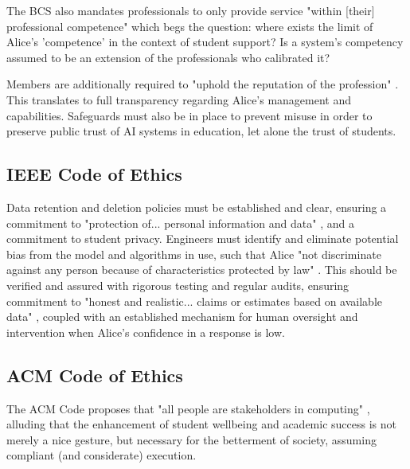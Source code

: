 \documentclass[14pt,a4paper]{article}
\begin{document}
\begin{multicols}{2}
The BCS also mandates professionals to only provide service "within [their] professional competence" \textit{\parencite[p. 2]{BCS2024}} which begs the question: where exists the limit of Alice's 'competence' in the context of student support? Is a system's competency assumed to be an extension of the professionals who calibrated it?

Members are additionally required to "uphold the reputation of the profession" \textit{\parencite[p. 3]{BCS2024}}. This translates to full transparency regarding Alice's management and capabilities. Safeguards must also be in place to prevent misuse in order to preserve public trust of AI systems in education, let alone the trust of students.

\subsection{IEEE Code of Ethics}


Data retention and deletion policies must be established and clear, ensuring a commitment to "protection of... personal information and data" \textit{\parencite[p. 1]{IEEE2024}}, and a commitment to student privacy.
Engineers must identify and eliminate potential bias from the model and algorithms in use, such that Alice "not discriminate against any person because of characteristics protected by law" \textit{\parencite[p. 1]{IEEE2024}}.
This should be verified and assured with rigorous testing and regular audits, ensuring commitment to "honest and realistic... claims or estimates based on available data" \textit{\parencite[p. 2]{IEEE2024}}, coupled with an established mechanism for human oversight and intervention when Alice's confidence in a response is low.

\subsection{ACM Code of Ethics}

The ACM Code proposes that "all people are stakeholders in computing" \textit{\parencite[p. 1]{ACM2024}}, alluding that the enhancement of student wellbeing and academic success is not merely a nice gesture, but necessary for the betterment of society, assuming compliant (and considerate) execution.



\end{multicols}
\end{document}
